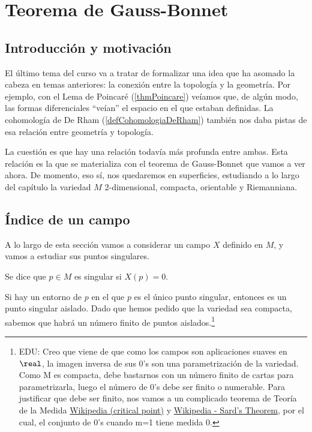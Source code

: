 \chapter{Teorema de Gauss-Bonnet}
\label{chapGaussBonnet}

\section{Introducción y motivación}

El último tema del curso va a tratar de formalizar una idea que ha asomado la cabeza en temas anteriores: la conexión entre la topología y la geometría. Por ejemplo, con el Lema de Poincaré (\ref{thmPoincare}) veíamos que, de algún modo, las formas diferenciales ``veían'' el espacio en el que estaban definidas. La cohomología de De Rham (\ref{defCohomologiaDeRham}) también nos daba pistas de esa relación entre geometría y topología.

La cuestión es que hay una relación todavía más profunda entre ambas. Esta relación es la que se materializa con el teorema de Gauss-Bonnet que vamos a ver ahora. De momento, eso sí, nos quedaremos en superficies, estudiando a lo largo del capítulo la variedad $M$ 2-dimensional, compacta, orientable y Riemanniana.

\section{Índice de un campo}

A lo largo de esta sección vamos a considerar un campo $X$ definido en $M$, y vamos a estudiar sus puntos singulares.

\begin{defn} Se dice que $p∈M$ es singular si $X(p) = 0$. \end{defn}

Si hay un entorno de $p$ en el que $p$ es el único punto singular, entonces es un punto singular aislado. Dado que hemos pedido que la variedad sea compacta, sabemos que habrá un número finito de puntos aislados.\footnote{EDU: Creo que viene de que como los campos son aplicaciones suaves en $\real$, la imagen inversa de sus 0's son una parametrización de la variedad. Como M es compacta, debe bastarnos con un número finito de cartas para parametrizarla, luego el número de 0's debe ser finito o numerable. Para justificar que debe ser finito, nos vamos a un complicado teorema de Teoría de la Medida \href{http://en.wikipedia.org/wiki/Critical\_point\_mathematics}{Wikipedia (critical point)} y \href{http://en.wikipedia.org/wiki/Sard's\_theorem}{Wikipedia - Sard's Theorem}, por el cual, el conjunto de 0's cuando m=1 tiene medida 0.}


